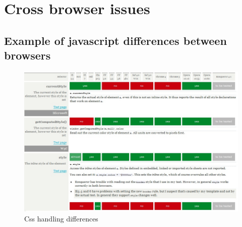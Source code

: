 \chapter{Cross browser issues}\label{annexe:JavaScript differences}


\section*{Example of javascript differences between browsers}
\begin{figure}[!ht]
\centering
\includegraphics[width=\textwidth]{img/css.jpg}
\caption{Css handling differences}
\label{figure:market-brosers}
\end{figure}

